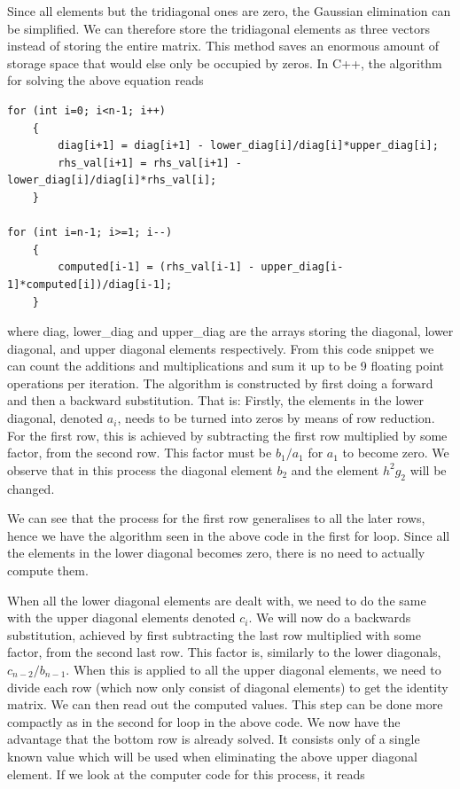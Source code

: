 \documentclass{emulateapj}
\begin{document}
        Since all elements but the tridiagonal ones are zero, the Gaussian elimination can be simplified. We can therefore store the tridiagonal elements as three vectors instead of storing the entire matrix. This method saves an enormous amount of storage space that would else only be occupied by zeros. In C++, the algorithm for solving the above equation reads
        
\begin{lstlisting}
for (int i=0; i<n-1; i++)
    {
        diag[i+1] = diag[i+1] - lower_diag[i]/diag[i]*upper_diag[i];
        rhs_val[i+1] = rhs_val[i+1] - lower_diag[i]/diag[i]*rhs_val[i];
    }
        
for (int i=n-1; i>=1; i--)
    {
        computed[i-1] = (rhs_val[i-1] - upper_diag[i-1]*computed[i])/diag[i-1];
    }
\end{lstlisting}
        where diag, lower\_diag and upper\_diag are the arrays storing the diagonal, lower diagonal, and upper diagonal elements respectively. From this code snippet we can count the additions and multiplications and sum it up to be 9 floating point operations per iteration. The algorithm is constructed by first doing a forward and then a backward substitution. That is: Firstly, the elements in the lower diagonal, denoted \( a_i\), needs to be turned into zeros by means of row reduction. For the first row, this is achieved by subtracting the first row multiplied by some factor, from the second row. This factor must be \( b_1/a_1 \) for \( a_1 \) to become zero. We observe that in this process the diagonal element \( b_2 \) and the element \( h^2g_2 \) will be changed.
        
        We can see that the process for the first row generalises to all the later rows, hence we have the algorithm seen in the above code in the first for loop. Since all the elements in the lower diagonal becomes zero, there is no need to actually compute them.
        
        When all the lower diagonal elements are dealt with, we need to do the same with the upper diagonal elements denoted \( c_i \). We will now do a backwards substitution, achieved by first subtracting the last row multiplied with some factor, from the second last row. This factor is, similarly to the lower diagonals, \( c_{n-2}/b_{n-1} \). When this is applied to all the upper diagonal elements, we need to divide each row (which now only consist of diagonal elements) to get the identity matrix. We can then read out the computed values. This step can be done more compactly as in the second for loop in the above code. We now have the advantage that the bottom row is already solved. It consists only of a single known value which will be used when eliminating the above upper diagonal element. If we look at the computer code for this process, it reads
        
\end{document}
